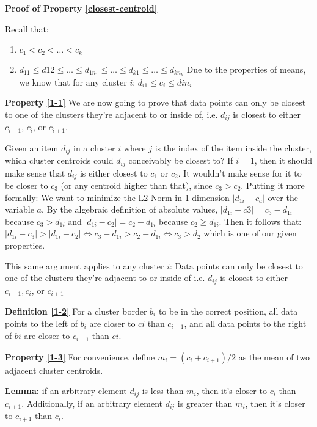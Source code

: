 \documentclass[conference]{IEEEtran}
\begin{document}
\textbf{Proof of Property \ref{closest-centroid}}

Recall that:
\begin{enumerate}
\item $c_1 < c_2 < \dots < c_k$
\item $d_{11} \leq d12 \leq \dots \leq d_{1n_1} \leq \dots \leq d_{k1} \leq \dots \leq d_{kn_k}$
Due to the properties of means, we know that for any cluster $i$:
$d_{i1} \leq c_i \leq din_i$
\end{enumerate}

\textbf{Property \ref{1-1}}
We are now going to prove that data points can only be closest to one of the clusters they’re adjacent to or inside of,
i.e. $d_{ij}$ is closest to either $c_{i-1}$, $c_i$, or $c_{i+1}$.

Given an item $d_{ij}$ in a cluster $i$ where $j$ is the index of the item inside the cluster, which cluster centroids could $d_{ij}$ conceivably be closest to?
If $i=1$, then it should make sense that $d_{ij}$ is either closest to $c_1$ or $c_2$. It wouldn’t make sense for it to be closer to $c_3$ (or any centroid higher than that), since $c_3 > c_2$.
Putting it more formally: We want to minimize the L2 Norm in 1 dimension $|d_{1i} - c_a|$ over the variable $a$.
By the algebraic definition of absolute values, $|d_{1i}-c3| = c_3-d_{1i}$ because $c_3 > d_{1i}$ and $|d_{1i}-c_2| = c_2-d_{1i}$ because $c_2 \geq d_{1i}$.
Then it follows that:
$|d_{1i} - c_3| > |d_{1i} - c_2| \iff c_3 - d_{1i} > c_2 - d_{1i} \iff c_3 > d_2$ which is one of our given properties.

This same argument applies to any cluster $i$: Data points can only be closest to one of the clusters they’re adjacent to or inside of
i.e. $d_{ij}$ is closest to either $c_{i-1}, c_i$, or $c_{i+1}$

\textbf{Definition \ref{1-2}}
For a cluster border $b_i$ to be in the correct position, all data points to the left of $b_i$ are closer to $ci$ than $c_{i+1}$, and all data points to the right of $bi$ are closer to $c_{i+1}$ than $ci$.

\textbf{Property \ref{1-3}}
For convenience, define $m_i = (c_i+c_{i+1})/2$ as the mean of two adjacent cluster centroids.

\textbf{Lemma:}
if an arbitrary element $d_{ij}$ is less than $m_i$, then it’s closer to $c_i$ than $c_{i+1}$.
Additionally, if an arbitrary element $d_{ij}$ is greater than $m_i$, then it’s closer to $c_{i+1}$ than $c_i$.
\end{document}
